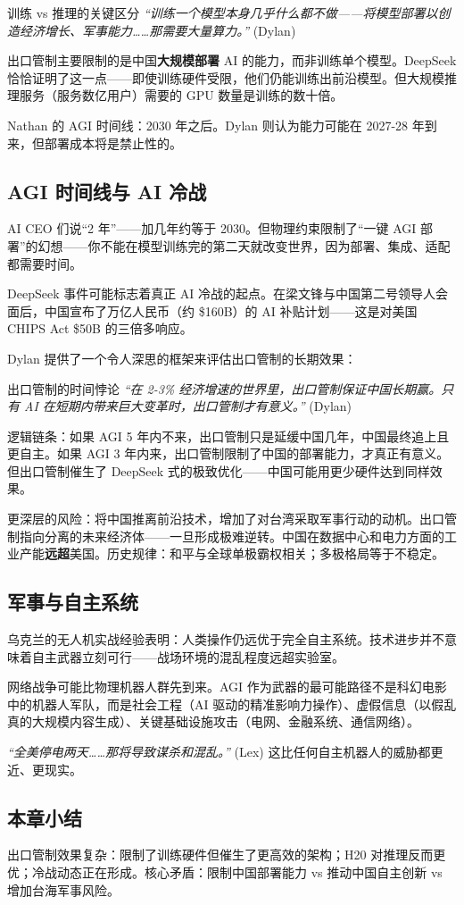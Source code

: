 \begin{importantbox}{训练 vs 推理的关键区分}
\textit{``训练一个模型本身几乎什么都不做——将模型部署以创造经济增长、军事能力……那需要大量算力。''} (Dylan)

出口管制主要限制的是中国\textbf{大规模部署} AI 的能力，而非训练单个模型。DeepSeek 恰恰证明了这一点——即使训练硬件受限，他们仍能训练出前沿模型。但大规模推理服务（服务数亿用户）需要的 GPU 数量是训练的数十倍。
\end{importantbox}

Nathan 的 AGI 时间线：2030 年之后。Dylan 则认为能力可能在 2027-28 年到来，但部署成本将是禁止性的。

\subsection{AGI 时间线与 AI 冷战}

AI CEO 们说``2 年''——加几年约等于 2030。但物理约束限制了``一键 AGI 部署''的幻想——你不能在模型训练完的第二天就改变世界，因为部署、集成、适配都需要时间。

DeepSeek 事件可能标志着真正 AI 冷战的起点。在梁文锋与中国第二号领导人会面后，中国宣布了万亿人民币（约 \$160B）的 AI 补贴计划——这是对美国 CHIPS Act \$50B 的三倍多响应。

Dylan 提供了一个令人深思的框架来评估出口管制的长期效果：

\begin{warningbox}{出口管制的时间悖论}
\textit{``在 2-3\% 经济增速的世界里，出口管制保证中国长期赢。只有 AI 在短期内带来巨大变革时，出口管制才有意义。''} (Dylan)

逻辑链条：如果 AGI 5 年内不来，出口管制只是延缓中国几年，中国最终追上且更自主。如果 AGI 3 年内来，出口管制限制了中国的部署能力，才真正有意义。但出口管制催生了 DeepSeek 式的极致优化——中国可能用更少硬件达到同样效果。

更深层的风险：将中国推离前沿技术，增加了对台湾采取军事行动的动机。出口管制指向分离的未来经济体——一旦形成极难逆转。中国在数据中心和电力方面的工业产能\textbf{远超}美国。历史规律：和平与全球单极霸权相关；多极格局等于不稳定。
\end{warningbox}

\subsection{军事与自主系统}

乌克兰的无人机实战经验表明：人类操作仍远优于完全自主系统。技术进步并不意味着自主武器立刻可行——战场环境的混乱程度远超实验室。

网络战争可能比物理机器人群先到来。AGI 作为武器的最可能路径不是科幻电影中的机器人军队，而是社会工程（AI 驱动的精准影响力操作）、虚假信息（以假乱真的大规模内容生成）、关键基础设施攻击（电网、金融系统、通信网络）。

\textit{``全美停电两天……那将导致谋杀和混乱。''} (Lex) 这比任何自主机器人的威胁都更近、更现实。

\subsection{本章小结}

出口管制效果复杂：限制了训练硬件但催生了更高效的架构；H20 对推理反而更优；冷战动态正在形成。核心矛盾：限制中国部署能力 vs 推动中国自主创新 vs 增加台海军事风险。

